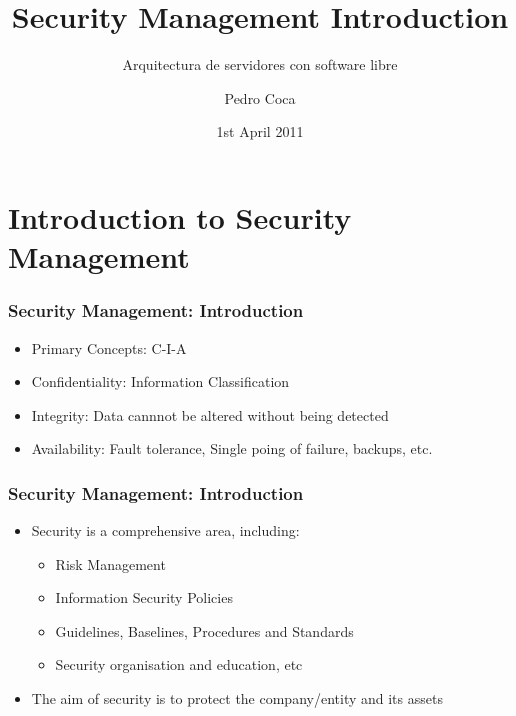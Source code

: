 \documentclass{beamer}
\begin{document}
\title{Security Management Introduction}
\subtitle{Arquitectura de servidores con software libre}
\author{Pedro Coca}
\date{1st April 2011}



\section{Introduction to Security Management}

\begin{frame}
\frametitle{Security Management: Introduction}
\begin{itemize}
\item Primary Concepts: C-I-A 
\item Confidentiality: Information Classification
\item Integrity: Data cannnot be altered without being detected
\item Availability: Fault tolerance, Single poing of failure, backups, etc.
\end{itemize}
\end{frame}


\begin{frame}
\frametitle{Security Management: Introduction}
\begin{itemize}
\item Security is a comprehensive area, including:
  \begin{itemize}
  \item Risk Management
  \item Information Security Policies
  \item Guidelines, Baselines, Procedures and Standards
  \item Security organisation and education, etc
  \end{itemize}
\item The aim of security is to protect the company/entity and its assets
\end{itemize}
\end{frame}
\end{document}
